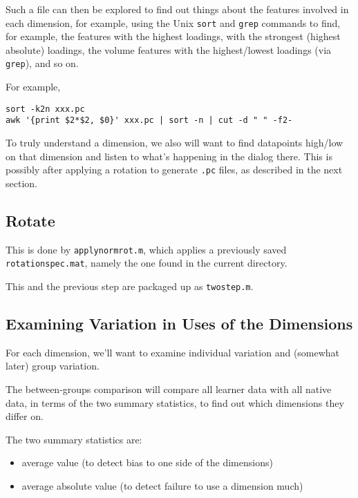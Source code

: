 \documentclass[11pt]{article}
\begin{document}
Such a file can then be explored to find out things about the features
involved in each dimension, for example, using the Unix {\tt sort} and
{\tt grep} commands to find, for example, the features with the
highest loadings, with the strongest (highest absolute) loadings, the
volume features with the highest/lowest loadings (via {\tt grep}), and
so on.

For example, 

\begin{verbatim}
sort -k2n xxx.pc  
awk '{print $2*$2, $0}' xxx.pc | sort -n | cut -d " " -f2-
\end{verbatim}

To truly understand a dimension, we also will want to find datapoints
high/low on that dimension and listen to what's happening in the
dialog there.  This is possibly after applying a rotation to generate
{\tt .pc} files, as described in the next section. 


\subsection{Rotate}

This is done by {\tt applynormrot.m}, which applies a previously saved
{\tt rotationspec.mat}, namely the one found in the current directory.

This and the previous step are packaged up as {\tt twostep.m}.

\subsection{Examining  Variation in Uses of the Dimensions}

For each dimension, we'll want to examine individual variation 
and (somewhat later) group variation.

The between-groups comparison will compare all learner data with all
native data, in terms of the two summary statistics, to find out which
dimensions they differ on.

The two summary statistics are:
\begin{itemize}   \setlength{\itemsep}{0pt}\setlength{\parskip}{0pt}
\item average value (to detect bias to one side of the dimensions)   
\item average absolute value (to detect failure to use a dimension much)
\end{itemize}
\end{document}
